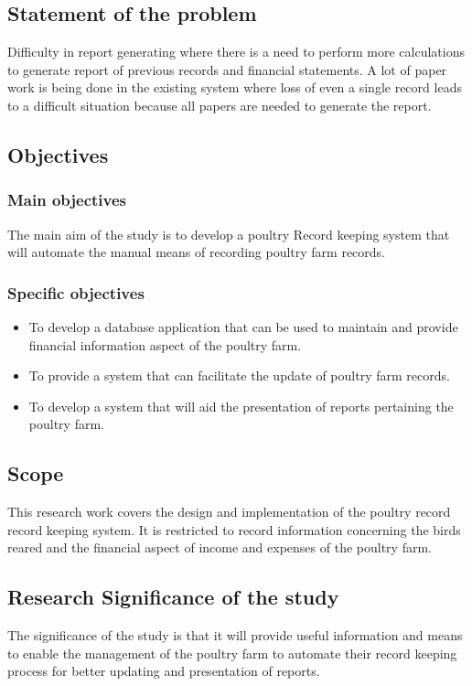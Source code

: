 \documentclass[12pt,]{article}
\begin{document}
\subsection{Statement of the problem}
Difficulty in report generating where there is a need to perform more calculations to generate report of previous records and financial statements. A lot of paper work is being done in the existing system where loss of even a  single record leads to a difficult situation because all papers are needed to generate the report.

\subsection{Objectives}
\subsubsection{Main objectives}
The main aim of the study is to develop a poultry Record keeping system that will automate the manual means of recording poultry farm records.


\subsubsection{Specific objectives}
\begin{itemize}
\item To develop a database application that can be used to maintain and provide financial information aspect of the poultry farm.
\item To provide a system that can facilitate the update of poultry farm records.
\item To develop a system that will aid the presentation of reports pertaining the poultry farm.
\end{itemize}

\subsection{Scope}
This research work covers the design and implementation of the poultry record record keeping system. It is restricted to record information concerning the birds reared and the financial aspect of income and expenses of the poultry farm.
\subsection{Research Significance of the study}

The significance of the study is that it will provide useful information and means to enable the management of the poultry farm to automate their record keeping process for better updating and presentation of reports.
\end{document}
